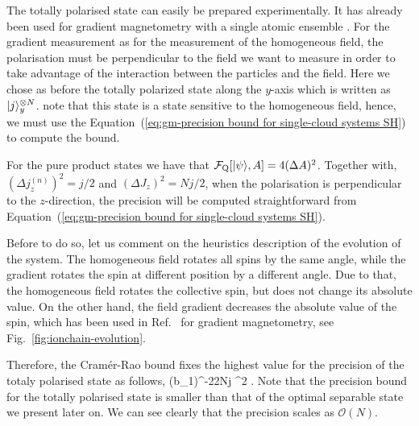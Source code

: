
The totally polarised state can easily be prepared experimentally.
It has already been used for gradient magnetometry with a single atomic ensemble \cite{Koschorreck2011,Vengalattore2007}.
For the gradient measurement as for the measurement of the homogeneous field, the polarisation must be perpendicular to the field we want to measure in order to take advantage of the interaction between the particles and the field.
Here we chose as before the totally polarized state along the $y$-axis which is written as $\vert{j}\rangle_y^{\otimes N}$.
note that this state is a state sensitive to the homogeneous field, hence, we must use the Equation~(\ref{eq:gm-precision bound for single-cloud systems SH}) to compute the bound.

For the pure product states we have that $\mathcal{F}_{\textnormal{Q}}[{\textstyle \vert{\psi}\rangle, A}] = 4(\Delta A)^2$.
Together with,
$(\Delta j_z^{(n)})^2=j/2$ and $(\Delta J_z)^2=Nj/2$, when the polarisation is
perpendicular to the $z$-direction, the precision will be computed straightforward from Equation~(\ref{eq:gm-precision bound for single-cloud systems SH}).

Before to do so, let us comment on the heuristics description of the evolution of the system.
The homogeneous field rotates all spins by the same angle, while the gradient rotates the spin at different position by a different angle.
Due to that, the homogeneous field rotates the collective spin, but does not change its absolute value.
On the other hand, the field gradient decreases the absolute value of the spin, which has been used in Ref.~\cite{Behbood2013} for gradient magnetometry, see Fig.~\ref{fig:ionchain-evolution}.

Therefore, the Cram\'er-Rao bound fixes the highest value for the precision
of the totaly polarised state as follows,
\be
  (\Delta b_1)^{-2}\leqslant 2Nj \sigma^2 .
\ee
Note that the precision bound for the totally polarised state
is smaller than that of the optimal separable state we present later on.
We can see clearly that the precision scales as $\mathcal{O}(N).$


